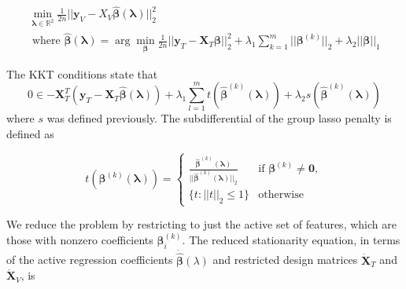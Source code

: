 \documentclass[10pt,letterpaper]{article}
\begin{document}
\begin{equation}
\begin{array}{c}
\min_{\boldsymbol{\lambda} \in \mathbb{R}^2} \frac{1}{2n} \bigl\lvert\bigl\lvert \boldsymbol{y}_V - X_V \hat{\boldsymbol{\beta}}(\boldsymbol{\lambda}) \bigl\rvert\bigl\rvert^2_2 \\
\text{ where }
\hat{\boldsymbol{\beta}}(\boldsymbol{\lambda}) = \arg\min_{\boldsymbol{\beta}} \frac{1}{2n} \bigl\lvert\bigl\lvert \boldsymbol{y}_T - \boldsymbol{X}_T \boldsymbol{\beta} \bigl\rvert\bigl\rvert^2_2
+ \lambda_1 \sum_{k=1}^m \lvert\lvert \boldsymbol\beta^{(k)} \rvert \rvert_2
+ \lambda_2 \lvert\lvert \boldsymbol\beta \rvert \rvert_1
\end{array}
\end{equation}

The KKT conditions state that
\begin{equation}
0 \in -\boldsymbol{X}_T^T(\boldsymbol{y}_T - \boldsymbol{X}_T \hat{\boldsymbol{\beta}}(\boldsymbol{\lambda}))
+ \lambda_1 \sum\limits_{l=1}^m t(\hat{\boldsymbol{\beta}}^{(k)}(\boldsymbol{\lambda}))
+ \lambda_2 s(\hat{\boldsymbol{\beta}}^{(k)}(\boldsymbol{\lambda}))
\end{equation}
where $s$ was defined previously. The subdifferential of the group lasso penalty is defined as

\begin{equation}
t(\boldsymbol{\beta}^{(k)}(\boldsymbol{\lambda})) = \begin{cases}
  \frac{ \hat{\boldsymbol{\beta}}^{(k)}(\boldsymbol{\lambda})}{||\hat{\boldsymbol{\beta}}^{(k)}(\boldsymbol{\lambda}) ||_2} & \text{if } \boldsymbol\beta^{(k)} \ne \boldsymbol{0}, \\
\{t : ||t||_2 \le 1\} & \text{otherwise}
\end{cases}
\end{equation}

We reduce the problem by restricting to just the active set of features, which are those with nonzero coefficients $\boldsymbol{\beta}^{(k)}_i$. The reduced stationarity equation, in terms of the active regression coefficients $\dot{\hat{\boldsymbol{\beta}}} (\lambda)$ and restricted design matrices $\dot{\boldsymbol{X}}_T$ and $\dot{\boldsymbol{X}}_V$, is
\end{document}
